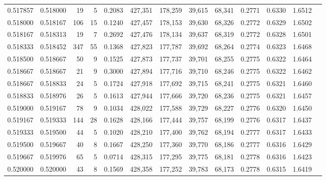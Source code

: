 \begin{tabular}{rrrrrrrrrrrrr}
0.517857 & 0.518000 &    19 &   5 &                                     0.2083 & 427,351 & 178,259 &  39,615 &  68,341 & 0.2771 & 0.6330 & 1.6512 \\
0.518000 & 0.518167 &   106 &  15 &                                     0.1240 & 427,457 & 178,153 &  39,630 &  68,326 & 0.2772 & 0.6329 & 1.6502 \\
0.518167 & 0.518313 &    19 &   7 &                                     0.2692 & 427,476 & 178,134 &  39,637 &  68,319 & 0.2772 & 0.6328 & 1.6501 \\
0.518333 & 0.518452 &   347 &  55 &                                     0.1368 & 427,823 & 177,787 &  39,692 &  68,264 & 0.2774 & 0.6323 & 1.6468 \\
0.518500 & 0.518667 &    50 &   9 &                                     0.1525 & 427,873 & 177,737 &  39,701 &  68,255 & 0.2775 & 0.6322 & 1.6464 \\
0.518667 & 0.518667 &    21 &   9 &                                     0.3000 & 427,894 & 177,716 &  39,710 &  68,246 & 0.2775 & 0.6322 & 1.6462 \\
0.518667 & 0.518833 &    24 &   5 &                                     0.1724 & 427,918 & 177,692 &  39,715 &  68,241 & 0.2775 & 0.6321 & 1.6460 \\
0.518833 & 0.518976 &    26 &   5 &                                     0.1613 & 427,944 & 177,666 &  39,720 &  68,236 & 0.2775 & 0.6321 & 1.6457 \\
0.519000 & 0.519167 &    78 &   9 &                                     0.1034 & 428,022 & 177,588 &  39,729 &  68,227 & 0.2776 & 0.6320 & 1.6450 \\
0.519167 & 0.519333 &   144 &  28 &                                     0.1628 & 428,166 & 177,444 &  39,757 &  68,199 & 0.2776 & 0.6317 & 1.6437 \\
0.519333 & 0.519500 &    44 &   5 &                                     0.1020 & 428,210 & 177,400 &  39,762 &  68,194 & 0.2777 & 0.6317 & 1.6433 \\
0.519500 & 0.519667 &    40 &   8 &                                     0.1667 & 428,250 & 177,360 &  39,770 &  68,186 & 0.2777 & 0.6316 & 1.6429 \\
0.519667 & 0.519976 &    65 &   5 &                                     0.0714 & 428,315 & 177,295 &  39,775 &  68,181 & 0.2778 & 0.6316 & 1.6423 \\
0.520000 & 0.520000 &    43 &   8 &                                     0.1569 & 428,358 & 177,252 &  39,783 &  68,173 & 0.2778 & 0.6315 & 1.6419 \\

\end{tabular}
